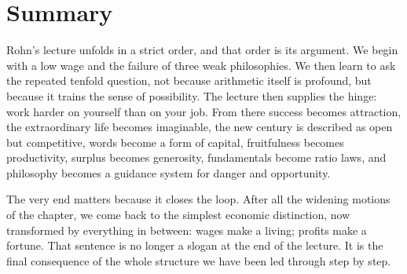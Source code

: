 \section{Summary}

Rohn's lecture unfolds in a strict order, and that order is its argument. We begin with a low wage and the failure of three weak philosophies. We then learn to ask the repeated tenfold question, not because arithmetic itself is profound, but because it trains the sense of possibility. The lecture then supplies the hinge: work harder on yourself than on your job. From there success becomes attraction, the extraordinary life becomes imaginable, the new century is described as open but competitive, words become a form of capital, fruitfulness becomes productivity, surplus becomes generosity, fundamentals become ratio laws, and philosophy becomes a guidance system for danger and opportunity.

The very end matters because it closes the loop. After all the widening motions of the chapter, we come back to the simplest economic distinction, now transformed by everything in between: wages make a living; profits make a fortune. That sentence is no longer a slogan at the end of the lecture. It is the final consequence of the whole structure we have been led through step by step.